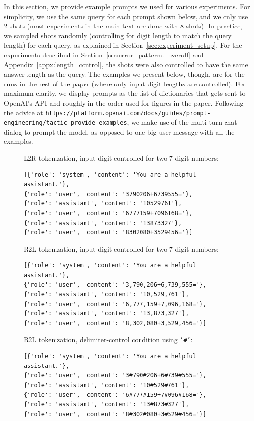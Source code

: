 \documentclass{article}
\theoremstyle{plain}
\theoremstyle{definition}
\theoremstyle{remark}
\begin{document}
In this section, we provide example prompts we used for various experiments. For simplicity, we use the same query for each prompt shown below, and we only use 2 shots (most experiments in the main text are done with 8 shots). In practice, we sampled shots randomly (controlling for digit length to match the query length) for each query, as explained in Section~\ref{sec:experiment_setup}. For the experiments described in Section~\ref{sec:error_patterns_overall} and Appendix~\ref{appx:length_control}, the shots were also controlled to have the same answer length as the query. The examples we present below, though, are for the runs in the rest of the paper (where only input digit lengths are controlled). For maximum clarity, we display prompts as the list of dictionaries that gets sent to OpenAI's API and roughly in the order used for figures in the paper. Following the advice at \texttt{https://platform.openai.com/docs/guides/prompt-engineering/tactic-provide-examples}, we make use of the multi-turn chat dialog to prompt the model, as opposed to one big user message with all the examples.


\begin{figure}[H]
L2R tokenization, input-digit-controlled for two 7-digit numbers:
    \begin{verbatim}
[{'role': 'system', 'content': 'You are a helpful assistant.'}, 
{'role': 'user', 'content': '3790206+6739555='}, 
{'role': 'assistant', 'content': '10529761'}, 
{'role': 'user', 'content': '6777159+7096168='}, 
{'role': 'assistant', 'content': '13873327'}, 
{'role': 'user', 'content': '8302080+3529456='}]
\end{verbatim}
\end{figure}

\begin{figure}[H]
R2L tokenization, input-digit-controlled for two 7-digit numbers:
    \begin{verbatim}
[{'role': 'system', 'content': 'You are a helpful assistant.'}, 
{'role': 'user', 'content': '3,790,206+6,739,555='}, 
{'role': 'assistant', 'content': '10,529,761'}, 
{'role': 'user', 'content': '6,777,159+7,096,168='}, 
{'role': 'assistant', 'content': '13,873,327'}, 
{'role': 'user', 'content': '8,302,080+3,529,456='}]
\end{verbatim}
\end{figure}

\begin{figure}[H]
R2L tokenization, delimiter-control condition using \texttt{'\#'}:
    \begin{verbatim}
[{'role': 'system', 'content': 'You are a helpful assistant.'}, 
{'role': 'user', 'content': '3#790#206+6#739#555='}, 
{'role': 'assistant', 'content': '10#529#761'}, 
{'role': 'user', 'content': '6#777#159+7#096#168='}, 
{'role': 'assistant', 'content': '13#873#327'}, 
{'role': 'user', 'content': '8#302#080+3#529#456='}]
\end{verbatim}
\end{figure}
\end{document}
